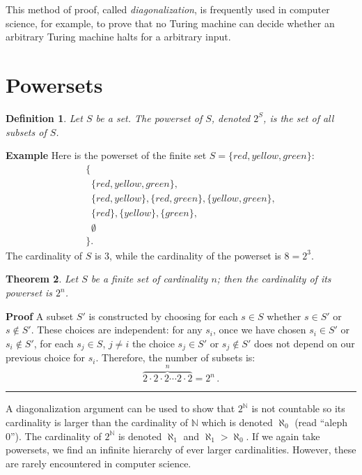 \documentclass[12pt,a4paper]{article}
\newtheorem{theorem}{Theorem}
\newtheorem{definition}[theorem]{Definition}
\newcommand*{\qed}{\hfill\rule[-2pt]{4pt}{10pt}}
\newenvironment{example}{\textbf{Example}}{}
\newenvironment{proof}{\textbf{Proof}}{\qed}
\begin{document}
This method of proof, called \emph{diagonalization}, is frequently used in computer science, for example, to prove that no Turing machine can decide whether an arbitrary Turing machine halts for a arbitrary input.

\section{Powersets}

\begin{definition}
Let $S$ be a set. The \emph{powerset} of $S$, denoted $2^S$, is the set of all subsets of $S$.
\end{definition}

\begin{example} Here is the powerset of the finite set
$S=\{\mathit{red}, \mathit{yellow}, \mathit{green}\}$:
\begin{displaymath}
\begin{array}{l}
\{\\
\;\;\{\mathit{red}, \mathit{yellow}, \mathit{green}\},\\
\;\;\{\mathit{red}, \mathit{yellow}\}, \{\mathit{red}, \mathit{green}\},
\{\mathit{yellow}, \mathit{green}\},\\ 
\;\;\{\mathit{red}\}, \{\mathit{yellow}\}, \{\mathit{green}\},\\
\;\;\emptyset\\
\}.
\end{array}
\end{displaymath}
The cardinality of $S$ is $3$, while the cardinality of the powerset
is $8=2^3$.
\end{example}
\begin{theorem}
Let $S$ be a finite set of cardinality $n$;
then the cardinality of its powerset is $2^{n}$.
\end{theorem}

\begin{proof}
A subset $S'$ is constructed by choosing for each $s\in S$ whether $s\in S'$ or $s\not\in S'$. These choices are independent:  for any $s_i$, once we have chosen $s_i\in S'$ or $s_i\not\in S'$, for each $s_j\in S$, $j\neq i$ the choice $s_j\in S'$ or $s_j\not\in S'$ does not depend on our previous choice for $s_i$. Therefore, the number of subsets is:
\[
\overbrace{2\cdot 2\cdot 2 \cdots 2\cdot 2}^{n} = 2^n\,.
\]
\end{proof}

A diagonalization argument can be used to show that $2^\mathbb{N}$ is not countable so its cardinality is larger than the cardinality of $\mathbb{N}$ which is denoted $\aleph_0$ (read ``aleph 0''). The cardinality of $2^\mathbb{N}$ is denoted $\aleph_1$ and $\aleph_1 >\aleph_0$. If we again take powersets, we find an infinite hierarchy of ever larger cardinalities. However, these are rarely encountered in computer science.
\end{document}
